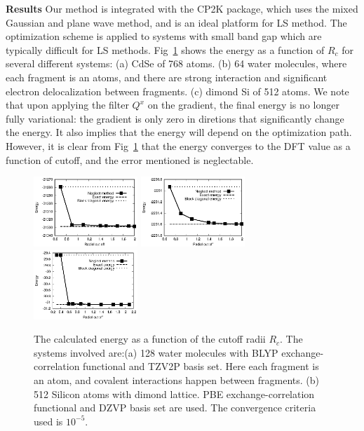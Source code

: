 \documentclass[prl,twocolumn,showpacs]{revtex4}
\begin{document}
\textbf{Results}
Our method is integrated with the CP2K package\cite{cp2kgeneral}, which uses the mixed Gaussian and plane wave method\cite{vandevondele2005quickstep}, and is an ideal platform for LS method. The optimization scheme is applied to systems with small band gap which are typically difficult for LS methods. Fig~\ref{fig:accuracy} shows the energy as a function of $R_c$ for several different systems: (a) CdSe of 768 atoms. (b) 64 water molecules, where each fragment is an atoms, and there are strong interaction and significant electron delocalization between fragments. (c) dimond Si of 512 atoms. We note that upon applying the filter $Q^x$ on the gradient, the final energy is no longer fully variational: the gradient is only zero in diretions that significantly change the energy. It also implies that the energy will depend on the optimization path. However, it is clear from Fig~\ref{fig:accuracy} that the energy converges to the DFT value as a function of cutoff, and the error mentioned is neglectable. 

\begin{figure}
\includegraphics[width=0.35\textwidth]{CdSe}
\includegraphics[width=0.35\textwidth]{H2O}
\includegraphics[width=0.35\textwidth]{Si}
\caption{The calculated energy as a function of the cutoff radii $R_c$. The systems involved are:(a) 128 water molecules with BLYP exchange-correlation functional and TZV2P basis set. Here each fragment is an atom, and covalent interactions happen between fragments. (b) 512 Silicon atoms with dimond lattice. PBE exchange-correlation functional and DZVP basis set are used. The convergence criteria used is $10^{-5}$.}
\label{fig:accuracy}
\end{figure}
\end{document}
